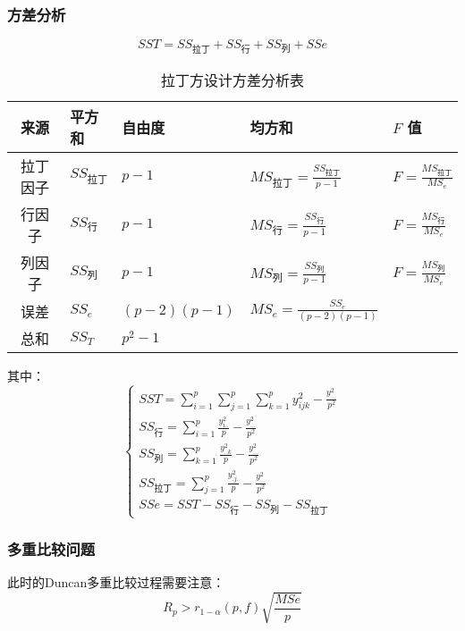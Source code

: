 \subsubsection{方差分析}
\begin{equation*}
	SST=SS_{\text{拉丁}}+SS_{\text{行}}+SS_{\text{列}}+SSe
\end{equation*}
\begin{table}[H] 
	\centering
	\begin{tabularx}{\textwidth}{c|>{\centering\arraybackslash}X>{\centering\arraybackslash}X>{\centering\arraybackslash}X>{\centering\arraybackslash}X}
		\toprule
		来源   & 平方和 & 自由度 & 均方和 & $F$ 值 \\ 
		\midrule
		拉丁因子 & $SS_\text{拉丁}$ & $p-1$ & $MS_\text{拉丁}= \frac{SS_\text{拉丁}}{p-1}$ & $F = \frac{MS_\text{拉丁}}{MS_e}$ \\ 
		行因子   & $SS_\text{行}$ & $p-1$ & $MS_\text{行} = \frac{SS_\text{行}}{p-1}$ & $F = \frac{MS_\text{行}}{MS_e}$ \\ 
		列因子   & $SS_\text{列}$ & $p-1$ & $MS_\text{列}=\frac{SS_\text{列}}{p-1}$ & $F = \frac{MS_\text{列}}{MS_e}$ \\ 
		误差     & $SS_e$ & $(p-2)(p-1)$ & $MS_e = \frac{SS_e}{(p-2)(p-1)}$ & \\ 
		总和     & $SS_T$ & $p^2-1$ & & \\ 
		\bottomrule
	\end{tabularx}
	\caption{拉丁方设计方差分析表}
\end{table}
其中：
\begin{equation*}
	\begin{cases}
		SST=\sum\limits_{i=1}^p\sum\limits_{j=1}^p\sum\limits_{k=1}^py_{ijk}^2-\frac{y_{...}^2}{p^2} \\
		SS_\text{行}=\sum\limits_{i=1}^p\frac{y_{i..}^2}{p}-\frac{y_{...}^2}{p^2} \\
		SS_\text{列}=\sum\limits_{k=1}^p\frac{y_{..k}^2}{p}-\frac{y_{...}^2}{p^2} \\
		SS_\text{拉丁}=\sum\limits_{j=1}^p\frac{y_{.j.}^2}{p}-\frac{y_{...}^2}{p^2} \\
		SSe=SST-SS_\text{行}-SS_\text{列}-SS_\text{拉丁}
	\end{cases}
\end{equation*}
\subsubsection{多重比较问题}
此时的Duncan多重比较过程需要注意：
\begin{equation*}
	R_p>r_{1-\alpha}(p,f)\sqrt{\frac{MSe}{p}}
\end{equation*}


